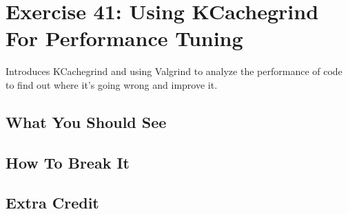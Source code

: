\chapter{Exercise 41: Using KCachegrind For Performance Tuning}

Introduces KCachegrind and using Valgrind to analyze the performance of code to find
out where it's going wrong and improve it.

\section{What You Should See}


\section{How To Break It}


\section{Extra Credit}



